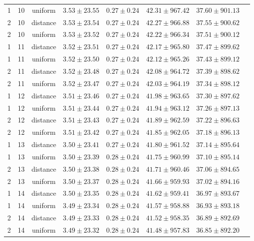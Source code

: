 \begin{tabular}{cccrrrrr}
1 & 10 & uniform & $3.53 \pm 23.55$ & $0.27 \pm 0.24$ & $42.31 \pm 967.42$ & $37.60 \pm 901.13$\\
2 & 10 & distance & $3.53 \pm 23.54$ & $0.27 \pm 0.24$ & $42.27 \pm 966.88$ & $37.55 \pm 900.62$\\
2 & 10 & uniform & $3.53 \pm 23.52$ & $0.27 \pm 0.24$ & $42.22 \pm 966.34$ & $37.51 \pm 900.12$\\
1 & 11 & distance & $3.52 \pm 23.51$ & $0.27 \pm 0.24$ & $42.17 \pm 965.80$ & $37.47 \pm 899.62$\\
1 & 11 & uniform & $3.52 \pm 23.50$ & $0.27 \pm 0.24$ & $42.12 \pm 965.26$ & $37.43 \pm 899.12$\\
2 & 11 & distance & $3.52 \pm 23.48$ & $0.27 \pm 0.24$ & $42.08 \pm 964.72$ & $37.39 \pm 898.62$\\
2 & 11 & uniform & $3.52 \pm 23.47$ & $0.27 \pm 0.24$ & $42.03 \pm 964.19$ & $37.34 \pm 898.12$\\
1 & 12 & distance & $3.51 \pm 23.46$ & $0.27 \pm 0.24$ & $41.98 \pm 963.65$ & $37.30 \pm 897.62$\\
1 & 12 & uniform & $3.51 \pm 23.44$ & $0.27 \pm 0.24$ & $41.94 \pm 963.12$ & $37.26 \pm 897.13$\\
2 & 12 & distance & $3.51 \pm 23.43$ & $0.27 \pm 0.24$ & $41.89 \pm 962.59$ & $37.22 \pm 896.63$\\
2 & 12 & uniform & $3.51 \pm 23.42$ & $0.27 \pm 0.24$ & $41.85 \pm 962.05$ & $37.18 \pm 896.13$\\
1 & 13 & distance & $3.50 \pm 23.41$ & $0.27 \pm 0.24$ & $41.80 \pm 961.52$ & $37.14 \pm 895.64$\\
1 & 13 & uniform & $3.50 \pm 23.39$ & $0.28 \pm 0.24$ & $41.75 \pm 960.99$ & $37.10 \pm 895.14$\\
2 & 13 & distance & $3.50 \pm 23.38$ & $0.28 \pm 0.24$ & $41.71 \pm 960.46$ & $37.06 \pm 894.65$\\
2 & 13 & uniform & $3.50 \pm 23.37$ & $0.28 \pm 0.24$ & $41.66 \pm 959.93$ & $37.02 \pm 894.16$\\
1 & 14 & distance & $3.50 \pm 23.35$ & $0.28 \pm 0.24$ & $41.62 \pm 959.41$ & $36.97 \pm 893.67$\\
1 & 14 & uniform & $3.49 \pm 23.34$ & $0.28 \pm 0.24$ & $41.57 \pm 958.88$ & $36.93 \pm 893.18$\\
2 & 14 & distance & $3.49 \pm 23.33$ & $0.28 \pm 0.24$ & $41.52 \pm 958.35$ & $36.89 \pm 892.69$\\
2 & 14 & uniform & $3.49 \pm 23.32$ & $0.28 \pm 0.24$ & $41.48 \pm 957.83$ & $36.85 \pm 892.20$\\
\bottomrule
\end{tabular}
